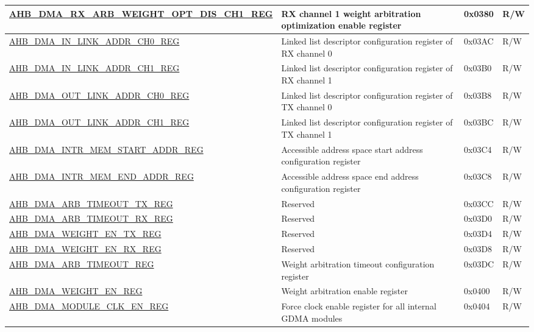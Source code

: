 \begin{longtable}{ | p{8cm} | p{8cm} | p{1.3cm} | p{1.5cm} | }
\hyperref[regdesc:AHBDMARXARBWEIGHTOPTDISCHNREG]{AHB\_DMA\_RX\_ARB\_WEIGHT\_OPT\_DIS\_CH1\_REG} & RX channel 1 weight arbitration optimization enable register & 0x0380 & R/W \\ \hline
\hyperref[regdesc:AHBDMAINLINKADDRCHNREG]{AHB\_DMA\_IN\_LINK\_ADDR\_CH0\_REG} & Linked list descriptor configuration register of RX channel 0 & 0x03AC & R/W \\ \hline
\hyperref[regdesc:AHBDMAINLINKADDRCHNREG]{AHB\_DMA\_IN\_LINK\_ADDR\_CH1\_REG} & Linked list descriptor configuration register of RX channel 1 & 0x03B0 & R/W \\ \hline
\hyperref[regdesc:AHBDMAOUTLINKADDRCHNREG]{AHB\_DMA\_OUT\_LINK\_ADDR\_CH0\_REG} & Linked list descriptor configuration register of TX channel 0 & 0x03B8 & R/W \\ \hline
\hyperref[regdesc:AHBDMAOUTLINKADDRCHNREG]{AHB\_DMA\_OUT\_LINK\_ADDR\_CH1\_REG} & Linked list descriptor configuration register of TX channel 1 & 0x03BC & R/W \\ \hline
\hyperref[regdesc:AHBDMAINTRMEMSTARTADDRREG]{AHB\_DMA\_INTR\_MEM\_START\_ADDR\_REG} & Accessible address space start address configuration register & 0x03C4 & R/W \\ \hline
\hyperref[regdesc:AHBDMAINTRMEMENDADDRREG]{AHB\_DMA\_INTR\_MEM\_END\_ADDR\_REG} & Accessible address space end address configuration register & 0x03C8 & R/W \\ \hline
\hyperref[regdesc:AHBDMAARBTIMEOUTTXREG]{AHB\_DMA\_ARB\_TIMEOUT\_TX\_REG} & Reserved & 0x03CC & R/W \\ \hline
\hyperref[regdesc:AHBDMAARBTIMEOUTRXREG]{AHB\_DMA\_ARB\_TIMEOUT\_RX\_REG} & Reserved & 0x03D0 & R/W \\ \hline
\hyperref[regdesc:AHBDMAWEIGHTENTXREG]{AHB\_DMA\_WEIGHT\_EN\_TX\_REG} & Reserved & 0x03D4 & R/W \\ \hline
\hyperref[regdesc:AHBDMAWEIGHTENRXREG]{AHB\_DMA\_WEIGHT\_EN\_RX\_REG} & Reserved & 0x03D8 & R/W \\ \hline
\hyperref[regdesc:AHBDMAARBTIMEOUTREG]{AHB\_DMA\_ARB\_TIMEOUT\_REG} & Weight arbitration timeout configuration register & 0x03DC & R/W \\ \hline
\hyperref[regdesc:AHBDMAWEIGHTENREG]{AHB\_DMA\_WEIGHT\_EN\_REG} & Weight arbitration enable register & 0x0400 & R/W \\ \hline
\hyperref[regdesc:AHBDMAMODULECLKENREG]{AHB\_DMA\_MODULE\_CLK\_EN\_REG} & Force clock enable register for all internal GDMA modules & 0x0404 & R/W \\ \hline

\end{longtable}
